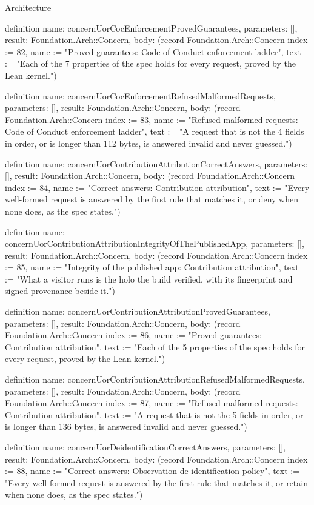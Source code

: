 \begin{lexlean}{Architecture}
\begin{semanticmodule}
definition{
  name: concernUorCocEnforcementProvedGuarantees,
  parameters: [],
  result: Foundation.Arch::Concern,
  body: (record Foundation.Arch::Concern {index := 82, name := "Proved guarantees: Code of Conduct enforcement ladder", text := "Each of the 7 properties of the spec holds for every request, proved by the Lean kernel."})
}

definition{
  name: concernUorCocEnforcementRefusedMalformedRequests,
  parameters: [],
  result: Foundation.Arch::Concern,
  body: (record Foundation.Arch::Concern {index := 83, name := "Refused malformed requests: Code of Conduct enforcement ladder", text := "A request that is not the 4 fields in order, or is longer than 112 bytes, is answered invalid and never guessed."})
}

definition{
  name: concernUorContributionAttributionCorrectAnswers,
  parameters: [],
  result: Foundation.Arch::Concern,
  body: (record Foundation.Arch::Concern {index := 84, name := "Correct answers: Contribution attribution", text := "Every well-formed request is answered by the first rule that matches it, or deny when none does, as the spec states."})
}

definition{
  name: concernUorContributionAttributionIntegrityOfThePublishedApp,
  parameters: [],
  result: Foundation.Arch::Concern,
  body: (record Foundation.Arch::Concern {index := 85, name := "Integrity of the published app: Contribution attribution", text := "What a visitor runs is the holo the build verified, with its fingerprint and signed provenance beside it."})
}

definition{
  name: concernUorContributionAttributionProvedGuarantees,
  parameters: [],
  result: Foundation.Arch::Concern,
  body: (record Foundation.Arch::Concern {index := 86, name := "Proved guarantees: Contribution attribution", text := "Each of the 5 properties of the spec holds for every request, proved by the Lean kernel."})
}

definition{
  name: concernUorContributionAttributionRefusedMalformedRequests,
  parameters: [],
  result: Foundation.Arch::Concern,
  body: (record Foundation.Arch::Concern {index := 87, name := "Refused malformed requests: Contribution attribution", text := "A request that is not the 5 fields in order, or is longer than 136 bytes, is answered invalid and never guessed."})
}

definition{
  name: concernUorDeidentificationCorrectAnswers,
  parameters: [],
  result: Foundation.Arch::Concern,
  body: (record Foundation.Arch::Concern {index := 88, name := "Correct answers: Observation de-identification policy", text := "Every well-formed request is answered by the first rule that matches it, or retain when none does, as the spec states."})
}


\end{semanticmodule}
\end{lexlean}
